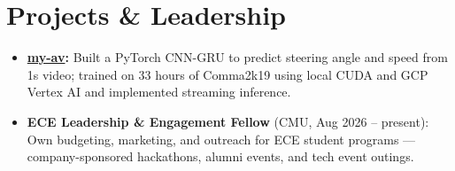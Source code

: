 \documentclass[11pt, letterpaper]{article}
\begin{document}
\section{Projects \& Leadership}
\begin{itemize}
  \item \textbf{\href{https://github.com/lordphone/my-av}{my-av}:} Built a PyTorch CNN-GRU to predict steering angle and speed from 1s video; trained on 33 hours of Comma2k19 using local CUDA and GCP Vertex AI and implemented streaming inference.
  \item \textbf{ECE Leadership \& Engagement Fellow} (CMU, Aug 2026 -- present): Own budgeting, marketing, and outreach for ECE student programs --- company-sponsored hackathons, alumni events, and tech event outings.
\end{itemize}
\end{document}
